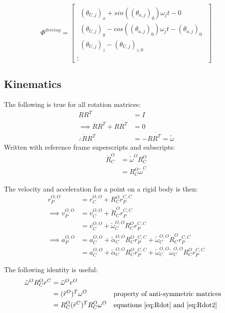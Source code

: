 \begin{equation}
    \Phi^{driving}=
    \begin{bmatrix}
    \begin{array}{l} %
    (\theta_{U,j})_x + sin((\theta_{a,j})_0)\omega_j t - 0\\
    (\theta_{U,j})_y - cos((\theta_{a,j})_0)\omega_j t - (\theta_{a,j})_0 \\
    (\theta_{U,j})_z - (\theta_{U,j})_{z,0}
    \end{array}\\
    \vdots
    \end{bmatrix}
\end{equation}

\subsection{Kinematics}
The following is true for all rotation matrices:
\begin{align}
RR^T&=I \\
\implies \dot{R}R^T+R\dot{R^T}&=0 \nonumber\\
\therefore \dot{R}R^T&=-R\dot{R^T}=\tilde{\omega} \label{eq:omega}
\end{align}
Written with reference frame superscripts and subscripts:
\begin{align}
       \dot{R}^O_C &=\tilde{\omega}^O R^O_C \label{eq:Rdot} \\
             &= R^O_C \tilde{\omega}^C \label{eq:Rdot2}
\end{align}

The velocity and acceleration for a point on a rigid body is then:
\begin{align}
r_P^{O,O}&=r_C^{O,O}+R^O_C r_P^{C,C} \\
\implies v_P^{O,O}&=v_C^{O,O}+\dot{R}^O_C r_P^{C,C} \nonumber\\
                 &=v_C^{O,O}+\tilde{\omega}^{O,O}_C R^O_C r_P^{C,C}  \label{eq:Vel3D}\\
\implies a_P^{O,O}&=a_C^{O,O}+\tilde{\alpha}^{O,O}_C R^O_C r_P^{C,C} + \tilde{\omega}^{O,O}_C \dot{R}^O_C r_P^{C,C} \nonumber \\
                  &=a_C^{O,O}+\tilde{\alpha}^{O,O}_C R^O_C r_P^{C,C} + \tilde{\omega}^{O,O}_C \tilde{\omega}^{O,O}_C R^O_C r_P^{C,C} \label{eq:Acc3D}
\end{align}

The following identity is useful:
\begin{align*}
\tilde{\omega}^O R^O_C r^C &= \tilde{\omega}^O r^O \\
                           &= (\tilde{r}^O)^T \omega^O   &&\text{property of anti-symmetric matrices} \\
                           &= R^O_C (\tilde{r}^C)^T R_C^O \omega^O &&\text{equations \ref{eq:Rdot} and \ref{eq:Rdot2}} 
\end{align*}

